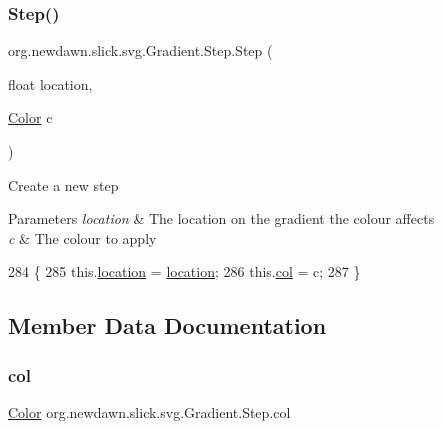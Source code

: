 \subsubsection{\texorpdfstring{Step()}{Step()}}
{\footnotesize\ttfamily org.\+newdawn.\+slick.\+svg.\+Gradient.\+Step.\+Step (\begin{DoxyParamCaption}\item[{float}]{location,  }\item[{\mbox{\hyperlink{classorg_1_1newdawn_1_1slick_1_1_color}{Color}}}]{c }\end{DoxyParamCaption})\hspace{0.3cm}{\ttfamily [inline]}}

Create a new step


\begin{DoxyParams}{Parameters}
{\em location} & The location on the gradient the colour affects \\
\hline
{\em c} & The colour to apply \\
\hline
\end{DoxyParams}

\begin{DoxyCode}
284                                              \{
285             this.\mbox{\hyperlink{classorg_1_1newdawn_1_1slick_1_1svg_1_1_gradient_1_1_step_a85a5f4a48eb280eb8e540918ed758c49}{location}} = \mbox{\hyperlink{classorg_1_1newdawn_1_1slick_1_1svg_1_1_gradient_1_1_step_a85a5f4a48eb280eb8e540918ed758c49}{location}};
286             this.\mbox{\hyperlink{classorg_1_1newdawn_1_1slick_1_1svg_1_1_gradient_1_1_step_a0d4bf9d51103987e597af344680fc9bc}{col}} = c;
287         \}
\end{DoxyCode}


\subsection{Member Data Documentation}
\mbox{\label{classorg_1_1newdawn_1_1slick_1_1svg_1_1_gradient_1_1_step_a0d4bf9d51103987e597af344680fc9bc}} 
\subsubsection{\texorpdfstring{col}{col}}
{\footnotesize\ttfamily \mbox{\hyperlink{classorg_1_1newdawn_1_1slick_1_1_color}{Color}} org.\+newdawn.\+slick.\+svg.\+Gradient.\+Step.\+col\hspace{0.3cm}{\ttfamily [package]}}

